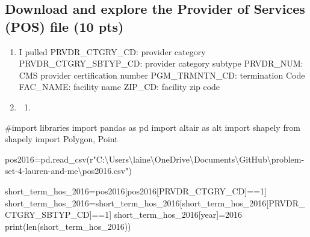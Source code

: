 \documentclass[
  letterpaper,
  DIV=11,
  numbers=noendperiod]{scrartcl}
\newenvironment{Shaded}{\begin{snugshade}}{\end{snugshade}}
\newcommand{\BuiltInTok}[1]{\textcolor[rgb]{0.00,0.23,0.31}{#1}}
\newcommand{\CommentTok}[1]{\textcolor[rgb]{0.37,0.37,0.37}{#1}}
\newcommand{\DecValTok}[1]{\textcolor[rgb]{0.68,0.00,0.00}{#1}}
\newcommand{\ImportTok}[1]{\textcolor[rgb]{0.00,0.46,0.62}{#1}}
\newcommand{\NormalTok}[1]{\textcolor[rgb]{0.00,0.23,0.31}{#1}}
\newcommand{\OperatorTok}[1]{\textcolor[rgb]{0.37,0.37,0.37}{#1}}
\newcommand{\StringTok}[1]{\textcolor[rgb]{0.13,0.47,0.30}{#1}}
\newcommand{\VerbatimStringTok}[1]{\textcolor[rgb]{0.13,0.47,0.30}{#1}}
\providecommand{\tightlist}{%
  \setlength{\itemsep}{0pt}\setlength{\parskip}{0pt}}\usepackage{longtable,booktabs,array}
\begin{document}
\subsection{Download and explore the Provider of Services (POS) file (10
pts)}\label{download-and-explore-the-provider-of-services-pos-file-10-pts}

\begin{enumerate}
\def\labelenumi{\arabic{enumi}.}
\item
  I pulled PRVDR\_CTGRY\_CD: provider category PRVDR\_CTGRY\_SBTYP\_CD:
  provider category subtype PRVDR\_NUM: CMS provider certification
  number PGM\_TRMNTN\_CD: termination Code FAC\_NAME: facility name
  ZIP\_CD: facility zip code
\item
  \begin{enumerate}
  \def\labelenumii{\alph{enumii}.}
  \tightlist
  \item
  \end{enumerate}
\end{enumerate}

\begin{Shaded}
\begin{Highlighting}[]
\CommentTok{\#import libraries}
\ImportTok{import}\NormalTok{ pandas }\ImportTok{as}\NormalTok{ pd}
\ImportTok{import}\NormalTok{ altair }\ImportTok{as}\NormalTok{ alt}
\ImportTok{import}\NormalTok{ shapely}
\ImportTok{from}\NormalTok{ shapely }\ImportTok{import}\NormalTok{ Polygon, Point}
\end{Highlighting}
\end{Shaded}

\begin{Shaded}
\begin{Highlighting}[]
\NormalTok{pos2016}\OperatorTok{=}\NormalTok{pd.read\_csv(}\VerbatimStringTok{r"C:\textbackslash{}Users\textbackslash{}laine\textbackslash{}OneDrive\textbackslash{}Documents\textbackslash{}GitHub\textbackslash{}problem{-}set{-}4{-}lauren{-}and{-}me\textbackslash{}pos2016.csv"}\NormalTok{)}
\end{Highlighting}
\end{Shaded}

\begin{Shaded}
\begin{Highlighting}[]
\NormalTok{short\_term\_hos\_2016}\OperatorTok{=}\NormalTok{pos2016[pos2016[}\StringTok{\textquotesingle{}PRVDR\_CTGRY\_CD\textquotesingle{}}\NormalTok{]}\OperatorTok{==}\DecValTok{1}\NormalTok{]}
\NormalTok{short\_term\_hos\_2016}\OperatorTok{=}\NormalTok{short\_term\_hos\_2016[short\_term\_hos\_2016[}\StringTok{\textquotesingle{}PRVDR\_CTGRY\_SBTYP\_CD\textquotesingle{}}\NormalTok{]}\OperatorTok{==}\DecValTok{1}\NormalTok{]}
\NormalTok{short\_term\_hos\_2016[}\StringTok{\textquotesingle{}year\textquotesingle{}}\NormalTok{]}\OperatorTok{=}\DecValTok{2016}
\BuiltInTok{print}\NormalTok{(}\BuiltInTok{len}\NormalTok{(short\_term\_hos\_2016))}
\end{Highlighting}
\end{Shaded}
\end{document}
